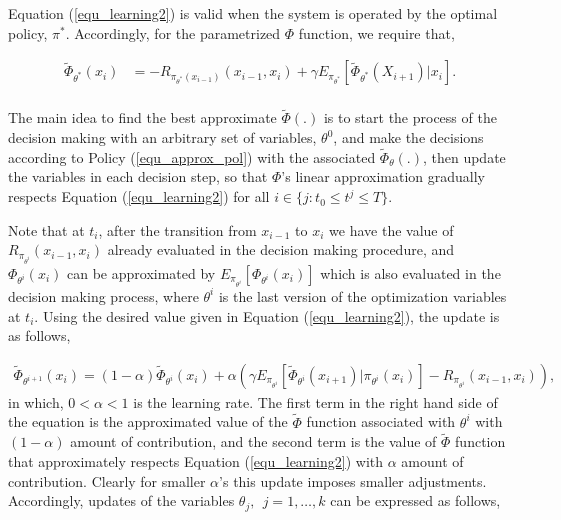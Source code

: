 \documentclass[12pt,aas_macros]{article}
\theoremstyle{definition}
\begin{document}
Equation (\ref{equ_learning2}) is valid when the system is operated by the optimal policy, $\pi^*$. Accordingly, for the parametrized $\Phi$ function, we require that,


\begin{equation} \label{equ_learning2}
\begin{aligned}
\tilde \Phi_{\theta^*}(x_{i}) &=  - R_{\pi_{\theta^*}(x_{i-1})}(x_{i-1},x_i)  + \gamma E_{\pi_{\theta^*}}[\tilde \Phi_{\theta^*}(X_{{i+1}})|x_i].\\
\end{aligned}
\end{equation}

The main idea to find the best approximate $\tilde {\Phi}(.)$ is to start the process of the decision making with an arbitrary set of variables, $\theta^0$, and make the decisions according to Policy (\ref{equ_approx_pol}) with the associated $\tilde \Phi_{\theta}(.)$, then update the variables in each decision step, so that $\Phi$'s linear approximation gradually respects Equation (\ref{equ_learning2}) for all $i \in \{j: t_0 \leq t^j \leq T\}$.

Note that at $t_i$, after the transition from $x_{{i-1}}$ to $x_{{i}}$ we have the value of $R_{\pi_{\theta^i}}(x_{i-1},x_i) $ already evaluated in the decision making procedure, and  $\Phi_{\theta^i}(x_{i})$ can be approximated by $E_{\pi_{\theta^i}}[ \Phi_{\theta^i}(x_{i})]$ which is also evaluated in the decision making process, where $\theta^i$ is the last version of the optimization variables at $t_i$. Using the desired value given in Equation (\ref{equ_learning2}), the update is as follows,

\begin{equation}\label{equ_updatePHI}
\begin{aligned}
\tilde \Phi_{\theta^{i+1}}(x_{{i}}) = (1-\alpha) \tilde \Phi_{\theta^{i}}(x_{{i}})+ \alpha  ( \gamma  E_{\pi_{\theta^i}}[\tilde \Phi_{\theta^{i}}(x_{{i+1}})|\pi_{\theta^{i}}(x_{{i}})] -R_{\pi_{\theta^i}}(x_{i-1},x_i) ),
\end{aligned}
\end{equation}
in which, $0<\alpha<1$ is the learning rate. The first term in the right hand side of the equation is the approximated value of the $\tilde \Phi$ function associated with $\theta^i$ with $(1-\alpha)$ amount of contribution, and the second term is the value of $\tilde \Phi$ function that approximately respects Equation (\ref{equ_learning2}) with $\alpha$ amount of contribution. Clearly for smaller $\alpha$'s this update imposes smaller adjustments. Accordingly, updates of the variables $\theta_j,~~j=1,\dots, k$ can be expressed as follows,
\end{document}
